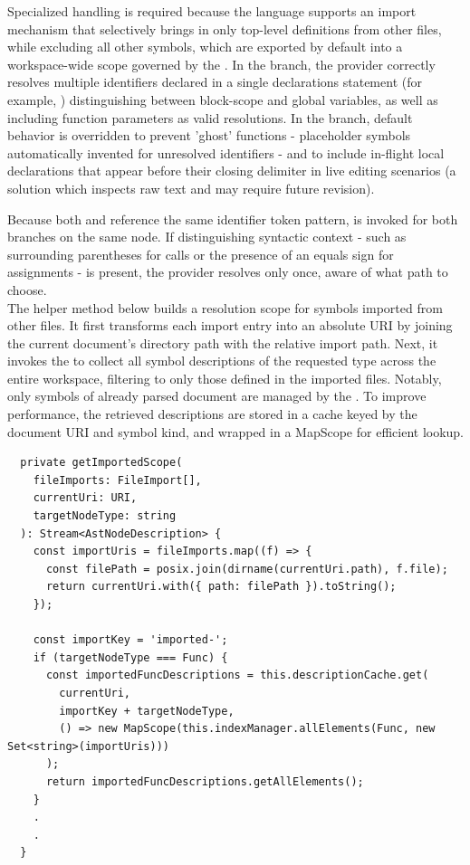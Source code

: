 Specialized handling is required because the language supports an import mechanism that selectively brings in only top-level definitions from other files, while excluding
all other symbols, which are exported by default into a workspace-wide scope governed by the . In the  branch, the provider correctly resolves
multiple identifiers declared in a single declarations statement (for example, ) distinguishing between block-scope and global variables, as well as including function parameters as valid resolutions.
In the  branch, default behavior is overridden to prevent 'ghost' functions - placeholder symbols automatically invented for unresolved identifiers - and to include in-flight local declarations
that appear before their closing delimiter in live editing scenarios (a solution which inspects raw  text and may require future revision).

Because both  and  reference the same identifier token pattern,  is invoked for both branches on the same node.
If distinguishing syntactic context - such as surrounding parentheses for calls or the presence of an equals sign for assignments - is present, the provider resolves only once, aware of what path to choose.
\\

The helper method below builds a resolution scope for symbols imported from other files. It first transforms each import entry into an absolute URI by joining the current
document's directory path with the relative import path. Next, it invokes the  to collect all symbol descriptions of the requested type across the entire
workspace, filtering to only those defined in the imported files. Notably, only symbols of already parsed document are managed by the .
To improve performance, the retrieved descriptions are stored in a cache keyed by the document URI and symbol kind, and wrapped in a MapScope for efficient lookup. 
\begin{verbatim}
  private getImportedScope(
    fileImports: FileImport[],
    currentUri: URI,
    targetNodeType: string
  ): Stream<AstNodeDescription> {
    const importUris = fileImports.map((f) => {
      const filePath = posix.join(dirname(currentUri.path), f.file);
      return currentUri.with({ path: filePath }).toString();
    });

    const importKey = 'imported-';
    if (targetNodeType === Func) {
      const importedFuncDescriptions = this.descriptionCache.get(
        currentUri,
        importKey + targetNodeType,
        () => new MapScope(this.indexManager.allElements(Func, new Set<string>(importUris)))
      );
      return importedFuncDescriptions.getAllElements();
    } 
    .
    .
  }
\end{verbatim}
\vspace{0.5em}

